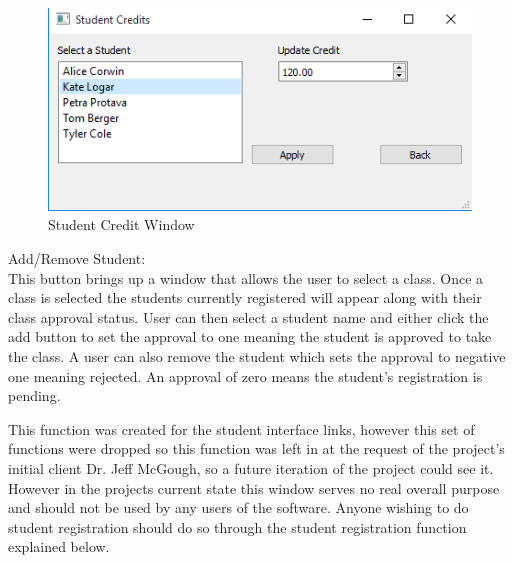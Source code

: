 \begin{figure}
  \includegraphics[width=\linewidth]{pics/userGuide/credits.png}
  \caption{Student Credit Window}
  \label{fig:User doc: Student Credits}
\end{figure}

Add/Remove Student:\\
This button brings up a window that allows the user to select a class. Once a class is selected the students currently registered will appear along with their class approval status. User can then select a student name and either click the add button to set the approval to one meaning the student is approved to take the class. A user can also remove the student which sets the approval to negative one meaning rejected. An approval of zero means the student's registration is pending.

This function was created for the student interface links, however this set of functions were dropped so this function was left in at the request of the project's initial client Dr. Jeff McGough, so a future iteration of the project could see it. However in the projects current state this window serves no real overall purpose and should not be used by any users of the software. Anyone wishing to do student registration should do so through the student registration function explained below.\\


